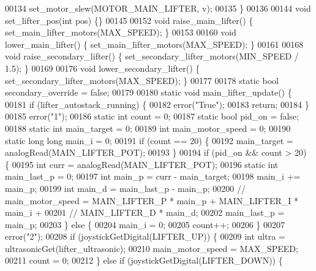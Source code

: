 \begin{DoxyCode}
{{{00134   set_motor_slew(MOTOR\_MAIN\_LIFTER, v);
00135 \}
00136 
00144 \textcolor{keywordtype}{void} set_lifter_pos(\textcolor{keywordtype}{int} pos) \{\}
00145 
00152 \textcolor{keywordtype}{void} raise_main_lifter() \{ set_main_lifter_motors(MAX\_SPEED); \}
00153 
00160 \textcolor{keywordtype}{void} lower_main_lifter() \{ set_main_lifter_motors(MAX\_SPEED); \}
00161 
00168 \textcolor{keywordtype}{void} raise_secondary_lifter() \{ set_secondary_lifter_motors(MIN\_SPEED / 1.5); \}
00169 
00176 \textcolor{keywordtype}{void} lower_secondary_lifter() \{ set_secondary_lifter_motors(MAX\_SPEED); \}
00177 
00178 \textcolor{keyword}{static} \textcolor{keywordtype}{bool} secondary_override = \textcolor{keyword}{false};
00179 
00180 \textcolor{keyword}{static} \textcolor{keywordtype}{void} main_lifter_update() \{
00181   \textcolor{keywordflow}{if} (lifter_autostack_running) \{
00182     error(\textcolor{stringliteral}{"True"});
00183     \textcolor{keywordflow}{return};
00184   \}
00185   error(\textcolor{stringliteral}{"1"});
00186   \textcolor{keyword}{static} \textcolor{keywordtype}{int} count = 0;
00187   \textcolor{keyword}{static} \textcolor{keywordtype}{bool} pid\_on = \textcolor{keyword}{false};
00188   \textcolor{keyword}{static} \textcolor{keywordtype}{int} main\_target = 0;
00189   \textcolor{keywordtype}{int} main\_motor\_speed = 0;
00190   \textcolor{keyword}{static} \textcolor{keywordtype}{long} \textcolor{keywordtype}{long} main\_i = 0;
00191   \textcolor{keywordflow}{if} (count == 20) \{
00192     main\_target = analogRead(MAIN\_LIFTER\_POT);
00193   \}
00194   \textcolor{keywordflow}{if} (pid\_on && count > 20) \{
00195     \textcolor{keywordtype}{int} curr = analogRead(MAIN\_LIFTER\_POT);
00196     \textcolor{keyword}{static} \textcolor{keywordtype}{int} main\_last\_p = 0;
00197     \textcolor{keywordtype}{int} main\_p = curr - main\_target;
00198     main\_i += main\_p;
00199     \textcolor{keywordtype}{int} main\_d = main\_last\_p - main\_p;
00200     \textcolor{comment}{// main\_motor\_speed = MAIN\_LIFTER\_P * main\_p + MAIN\_LIFTER\_I * main\_i +}
00201     \textcolor{comment}{// MAIN\_LIFTER\_D * main\_d;}
00202     main\_last\_p = main\_p;
00203   \} \textcolor{keywordflow}{else} \{
00204     main\_i = 0;
00205     count++;
00206   \}
00207   error(\textcolor{stringliteral}{"2"});
00208   \textcolor{keywordflow}{if} (joystickGetDigital(LIFTER\_UP)) \{
00209     \textcolor{keywordtype}{int} ultra = ultrasonicGet(lifter_ultrasonic);
00210     main\_motor\_speed = MAX\_SPEED;
00211     count = 0;
00212   \} \textcolor{keywordflow}{else} \textcolor{keywordflow}{if} (joystickGetDigital(LIFTER\_DOWN)) \{
}}}
\end{DoxyCode}
